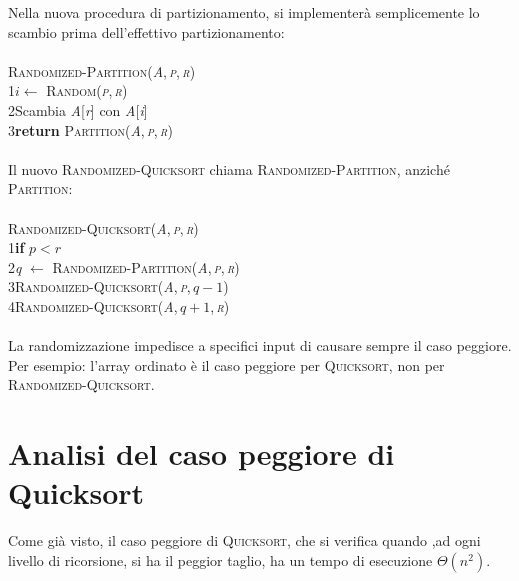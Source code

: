 \documentclass[10pt, a4paper]{report}
\newcommand\firsttab[1][0.5cm]{\hspace*{#1}}
\newcommand\secondtab[1][1cm]{\hspace*{#1}}
\begin{document}
Nella nuova procedura di partizionamento, si implementerà semplicemente lo scambio prima dell'effettivo partizionamento:\\\\
\textsc{Randomized-Partition(\textit{A},\,\textit{p},\,\textit{r})}\\
1\firsttab$i \leftarrow $ \textsc{Random(\textit{p},\,\textit{r})}\\
2\firsttab Scambia \textit{A}[\textit{r}] con \textit{A}[\textit{i}]\\
3\firsttab\textbf{return} \textsc{Partition(\textit{A},\,\textit{p},\,\textit{r})}\\\\
Il nuovo \textsc{Randomized-Quicksort} chiama \textsc{Randomized-Partition}, anziché \textsc{Partition}:\\\\
\textsc{Randomized-Quicksort(\textit{A},\,\textit{p},\,\textit{r})}\\
1\firsttab\textbf{if} $p < r$\\
2\secondtab\textit{q} $\leftarrow$ \textsc{Randomized-Partition(\textit{A},\,\textit{p},\,\textit{r})}\\
3\secondtab\textsc{Randomized-Quicksort(\textit{A},\,\textit{p},\,$q-1$)}\\
4\secondtab\textsc{Randomized-Quicksort(\textit{A},\,$q+1$,\,\textit{r})}\\\\
La randomizzazione impedisce a specifici input di causare sempre il caso peggiore. Per esempio: l'array ordinato è il caso peggiore per \textsc{Quicksort}, non per \textsc{Randomized-Quicksort}.
\section{Analisi del caso peggiore di Quicksort}
Come già visto, il caso peggiore di \textsc{Quicksort}, che si verifica quando ,ad ogni livello di ricorsione, si ha il peggior taglio, ha un tempo di esecuzione $\Theta(n^2)$.
\end{document}
